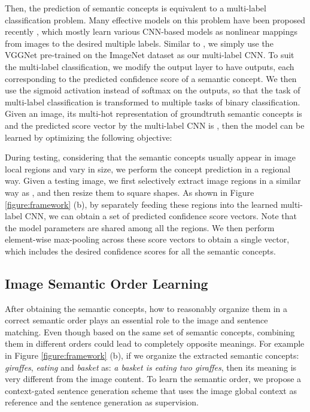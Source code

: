 \documentclass[10pt,twocolumn,letterpaper]{article}
\begin{document}
Then, the prediction of semantic concepts is
equivalent to a multi-label classification problem.
Many effective models on this problem have been proposed recently \cite{wei2014cnn,wu2016value,wang2016cnn,gong2013deep,wu2015deep},
which mostly learn various CNN-based models as nonlinear
mappings from images to the desired multiple labels.
Similar to \cite{wei2014cnn,wu2016value},
we simply use the VGGNet \cite{simonyan2014very} pre-trained
on the ImageNet dataset \cite{russakovsky2015imagenet}
as our multi-label CNN.
To suit the multi-label classification, we modify the output layer to have  outputs,
each corresponding to the predicted confidence score of a semantic concept.
We then use the sigmoid activation instead of softmax on the outputs,
so that the task of multi-label classification is transformed to multiple tasks of binary classification.
Given an image, its multi-hot representation of
groundtruth semantic concepts is  and
the predicted score vector by the multi-label CNN is
,
then the model can be learned by optimizing the following objective:






During testing, considering that the semantic concepts usually appear in
image local regions and vary in size, we perform the concept prediction
in a regional way.
Given a testing image, we first selectively extract  image regions in a similar way
as \cite{wei2014cnn}, and then resize them to square shapes.
As shown in Figure \ref{figure:framework} (b),
by separately feeding these regions into the learned multi-label CNN,
we can obtain a set of predicted confidence score vectors.
Note that the model parameters are shared among all the regions.
We then perform element-wise max-pooling across these score vectors
to obtain a single vector, which includes the desired confidence scores for
all the semantic concepts.












\subsection{Image Semantic Order Learning}
After obtaining the semantic concepts, how to reasonably organize them
in a correct semantic order plays an essential role to the image and sentence matching.
Even though based on the same set of semantic concepts,
combining them in different orders could lead to completely opposite meanings.
For example in Figure \ref{figure:framework} (b), if we organize the extracted
semantic concepts: \emph{giraffes}, \emph{eating} and \emph{basket}
as: \emph{a basket is eating two giraffes}, then its meaning is very
different from the image content.
To learn the semantic order, we propose a context-gated
sentence generation scheme that uses the image global context as reference and the
sentence generation as supervision.
\end{document}
